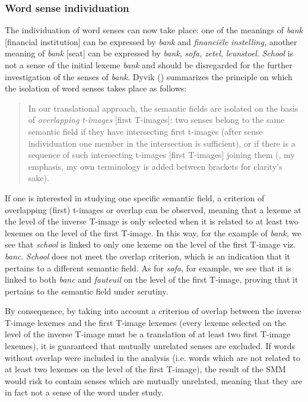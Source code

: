 \subsubsection{Word sense individuation}
\label{sec:3.4.3.4}
The individuation of word senses can now take place: one of the meanings of \textit{bank} [financial institution] can be expressed by \textit{bank} and \textit{financiële} \textit{instelling,} another meaning of \textit{bank} [seat] can be expressed by \textit{bank,} \textit{sofa,} \textit{zetel,} \textit{leunstoel}. \textit{School} is not a sense of the initial lexeme \textit{bank} and should be disregarded for the further investigation of the senses of \textit{bank.} Dyvik (\citealt[33]{langemets_translations_2005}) summarizes the principle on which the isolation of word senses takes place as follows:

\begin{quote}
In our translational approach, the semantic fields are isolated on the basis of \textit{overlapping} \textit{t-images} [first T-images]: two senses belong to the same semantic field if they have intersecting first t-images (after sense individuation one member in the intersection is sufficient), or if there is a sequence of such intersecting t-images [first T-images] joining them (\citealt[33]{langemets_translations_2005}, my emphasis, my own terminology is added between brackets for clarity’s sake).
\end{quote}

If one is interested in studying one specific semantic field, a criterion of overlapping (first) t-images or overlap can be observed, meaning that a lexeme at the level of the inverse T-image is only selected when it is related to at least two lexemes on the level of the first T-image. In this way, for the example of \textit{bank,} we see that \textit{school} is linked to only one lexeme on the level of the first T-image viz. \textit{banc}. \textit{School} does not meet the overlap criterion, which is an indication that it pertains to a different semantic field. As for \textit{sofa,} for example, we see that it is linked to both \textit{banc} and \textit{fauteuil} on the level of the first T-image, proving that it pertains to the semantic field under scrutiny.

By consequence, by taking into account a criterion of overlap between the inverse T-image lexemes and the first T-image lexemes (every lexeme selected on the level of the inverse T-image must be a translation of at least two first T-image lexemes), it is guaranteed that mutually unrelated senses are excluded. If words without overlap were included in the analysis (i.e. words which are not related to at least two lexemes on the level of the first T-image), the result of the SMM would risk to contain senses which are mutually unrelated, meaning that they are in fact not a sense of the word under study.

